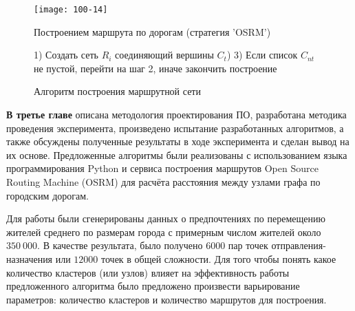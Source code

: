 \clearpage

\begin{figure}[ht!]
    \centering
    \texttt{[image: 100-14]}
    \caption{Построением маршрута по дорогам (стратегия 'OSRM')}
    \label{fig:osrm}
\end{figure}

\begin{figure}[ht!]
    \vspace*{-2em}
    \begin{algorithm}[H]
        1) Создать сеть \( R_i \) соединяющий вершины \( C_t \)) 
        3) Если список \( C_{nt} \) не пустой, перейти на шаг 2, иначе закончить построение\;
    \end{algorithm}
    \vspace*{-1em}
    \caption{Алгоритм построения маршрутной сети}
    \label{alg:min-length}
\end{figure}

\clearpage

\textbf{В третье главе} описана методология проектирования ПО, разработана методика проведения эксперимента, 
произведено испытание разработанных алгоритмов, а также обсуждены полученные результаты в ходе эксперимента 
и сделан вывод на их основе. Предложенные алгоритмы были реализованы с использованием языка программирования 
Python и сервиса построения маршрутов Open Source Routing Machine (OSRM) для расчёта расстояния между узлами 
графа по городским дорогам.

Для работы были сгенерированы данных о предпочтениях по перемещению жителей среднего по размерам города с 
примерным числом жителей около \( 350\ 000 \). В качестве результата, было получено \( 6000 \) пар точек 
отправления-назначения или \( 12000 \) точек в общей сложности. Для того чтобы понять какое количество 
кластеров (или узлов) влияет на эффективность работы предложенного алгоритма было предложено произвести 
варьирование параметров: количество кластеров и количество маршрутов для построения.

